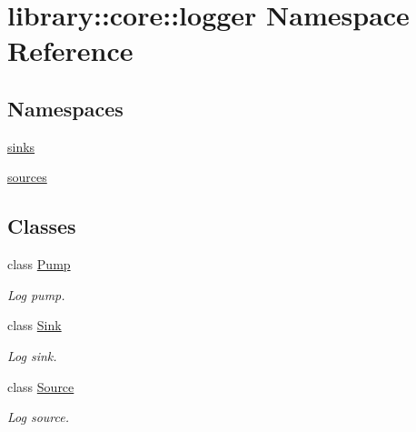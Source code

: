 \hypertarget{namespacelibrary_1_1core_1_1logger}{}\section{library\+:\+:core\+:\+:logger Namespace Reference}
\label{namespacelibrary_1_1core_1_1logger}
\subsection*{Namespaces}
\begin{DoxyCompactItemize}
\item 
 \hyperlink{namespacelibrary_1_1core_1_1logger_1_1sinks}{sinks}
\item 
 \hyperlink{namespacelibrary_1_1core_1_1logger_1_1sources}{sources}
\end{DoxyCompactItemize}
\subsection*{Classes}
\begin{DoxyCompactItemize}
\item 
class \hyperlink{classlibrary_1_1core_1_1logger_1_1_pump}{Pump}
\begin{DoxyCompactList}\small\item\em Log pump. \end{DoxyCompactList}\item 
class \hyperlink{classlibrary_1_1core_1_1logger_1_1_sink}{Sink}
\begin{DoxyCompactList}\small\item\em Log sink. \end{DoxyCompactList}\item 
class \hyperlink{classlibrary_1_1core_1_1logger_1_1_source}{Source}
\begin{DoxyCompactList}\small\item\em Log source. \end{DoxyCompactList}\end{DoxyCompactItemize}
